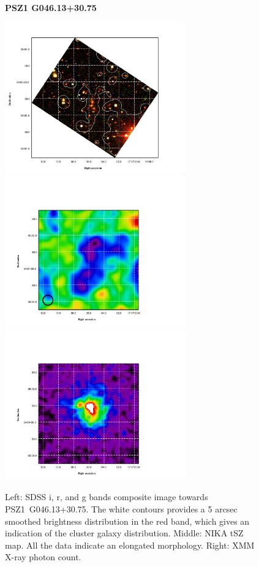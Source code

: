 \documentclass[11pt,a4paper,twoside,graphicx,color]{article}
\begin{document}
\begin{figure}[h!]
	\centering
	\textbf{PSZ1 G046.13+30.75}\par\medskip
	\includegraphics[trim=0.5cm 0cm 4cm 0cm, clip=true, height=6.5cm]{PSZ1G046_SDSS.pdf}
	\includegraphics[trim=2.5cm 0cm 7cm 0cm, clip=true,height=6.5cm]{PSZ1G046_NIKA.pdf}
	\includegraphics[trim=2.5cm 0cm 7cm 0cm, clip=true,height=6.5cm]{PSZ1G046_XMM.pdf}
	\caption{Left: SDSS i, r, and g bands composite image towards PSZ1~G046.13+30.75. The white contours provides a 5 arcsec smoothed brightness distribution in the red band, which gives an indication of the cluster galaxy distribution. Middle: NIKA tSZ map. All the data indicate an elongated morphology. Right: XMM X-ray photon count.}
	\label{fig:maps} 
\end{figure}
\end{document}
